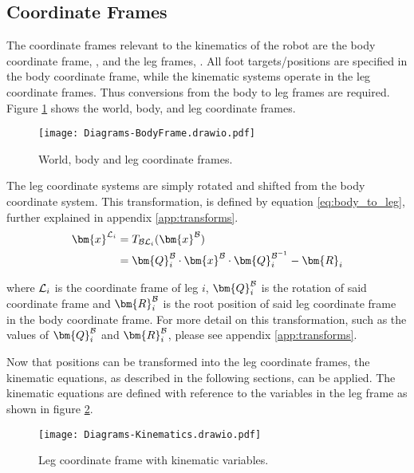         \subsection{Coordinate Frames}
            The coordinate frames relevant to the kinematics of the robot are the body coordinate frame, \fbody, and the leg frames, \fleg. All foot targets/positions are specified in the body coordinate frame, while the kinematic systems operate in the leg coordinate frames. Thus conversions from the body to leg frames are required. Figure \ref{fig:coords_top} shows the world, body, and leg coordinate frames.
            \begin{figure}[h]
                \centering
                \texttt{[image: Diagrams-BodyFrame.drawio.pdf]}
                \caption{World, body and leg coordinate frames.}
                \label{fig:coords_top}
            \end{figure}

            \noindent
            The leg coordinate systems are simply rotated and shifted from the body coordinate system. This transformation, is defined by equation \ref{eq:body_to_leg}, further explained in appendix \ref{app:transforms}.
            \begin{equation}\label{eq:body_to_leg}
            \begin{split}
                \bm{x}^\fleg &= \transframe{\bm{x}^\fbody}{\fbody}{\fleg} \\
                & = \bm{Q}_i^\fbody\cdot\bm{x}^\fbody\cdot\bm{Q}^{\fbody^{-1}}_{i} - \bm{R}_i
            \end{split}
            \end{equation}

            \noindent
            where \(\fleg\) is the coordinate frame of leg \(i\), \(\bm{Q}_i^\fbody\) is the rotation of said coordinate frame and \(\bm{R}^\fbody_i\) is the root position of said leg coordinate frame in the body coordinate frame. For more detail on this transformation, such as the values of \(\bm{Q}_i^\fbody\) and \(\bm{R}^\fbody_i\), please see
            appendix \ref{app:transforms}.

            Now that positions can be transformed into the leg coordinate frames, the kinematic equations, as described in the following sections, can be applied. The kinematic equations are defined with reference to the variables in the leg frame as shown in figure \ref{fig:kinematics}.
            \begin{figure}[h]
                \centering
                \texttt{[image: Diagrams-Kinematics.drawio.pdf]}
                \caption{Leg coordinate frame with kinematic variables.}
                \label{fig:kinematics}
            \end{figure}


